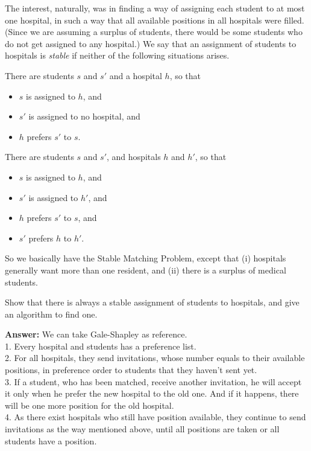 The interest, naturally, was in finding a way of assigning each student  to at most one hospital, in such a way that all available positions in all  hospitals were filled. (Since we are assuming a surplus of students, there  would be some students who do not get assigned to any hospital.)  We say that an assignment of students to hospitals is {\em stable} if neither  of the following situations arises.

\medskip
{} There are students $s$ and $s'$ and a hospital $h$, so that

\begin{itemize}
    \item $s$ is assigned to $h$, and  
    \item $s'$ is assigned to no hospital, and 
    \item $h$ prefers $s'$ to $s$.
\end{itemize}

\medskip
{} There are students $s$ and $s'$, and hospitals $h$ and $h'$, so that 

\begin{itemize}
    \item $s$ is assigned to $h$, and
    \item $s'$ is assigned to $h'$, and 
    \item $h$ prefers $s'$ to $s$, and
    \item $s'$ prefers $h$ to $h'$. 
\end{itemize}

So we basically have the Stable Matching Problem, except that (i)  hospitals generally want more than one resident, and (ii) there is a surplus  of medical students.

Show that there is always a stable assignment of students to hospitals, and give an algorithm to find one. 

{\bf Answer:} We can take Gale-Shapley as reference.  \\
1. Every hospital and students has a preference list. \\
2. For all hospitals, they send invitations, whose number equals to their available positions, in preference order to students that they haven't sent yet. \\
3. If a student, who has been matched, receive another invitation, he will accept it only when he prefer the new hospital to the old one. And if it happens, there will be one more position for the old hospital. \\
4. As there exist hospitals who still have position available, they continue to send invitations as the way mentioned above, until all positions are taken or all students have a position. \\

